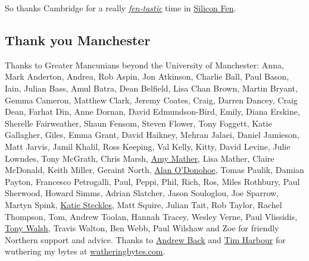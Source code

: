 \documentclass[
]{book}
\begin{document}
So thanks Cambridge for a really \emph{\href{https://en.wikipedia.org/wiki/The_Fens}{fen-tastic}} time in \href{https://en.wikipedia.org/wiki/Silicon_Fen}{Silicon Fen}. 🙏

\hypertarget{manchester}{%
\subsection{Thank you Manchester}\label{manchester}}

Thanks to Greater Mancunians beyond the University of Manchester: Anna, Mark Anderton, Andrea, Rob Aspin, Jon Atkinson, Charlie Ball, Paul Bason, Iain, Julian Bass, Amul Batra, Dean Belfield, Lisa Chan Brown, Martin Bryant, Gemma Cameron, Matthew Clark, Jeremy Coates, Craig, Darren Dancey, Craig Dean, Farhat Din, Anne Dornan, David Edmundson-Bird, Emily, Diana Erskine, Sherelle Fairweather, Shaun Fensom, Steven Flower, Tony Foggett, Katie Gallagher, Giles, Emma Grant, David Haikney, Mehran Jalaei, Daniel Jamieson, Matt Jarvis, Jamil Khalil, Ross Keeping, Val Kelly, Kitty, David Levine, Julie Lowndes, Tony McGrath, Chris Marsh, \href{https://twitter.com/MiniGirlGeek}{Amy Mather}, Lisa Mather, Claire McDonald, Keith Miller, Geraint North, \href{https://twitter.com/teknoteacher}{Alan O'Donohoe}, Tomas Paulik, Damian Payton, Francesco Petrogalli, Paul, Peppi, Phil, Rich, Ros, Miles Rothbury, Paul Sherwood, Howard Simms, Adrian Slatcher, Jason Souloglou, Joe Sparrow, Martyn Spink, \href{https://www.katiesteckles.co.uk/}{Katie Steckles}, Matt Squire, Julian Tait, Rob Taylor, Rachel Thompson, Tom, Andrew Toolan, Hannah Tracey, Wesley Verne, Paul Vlissidis, \href{https://en.wikipedia.org/wiki/Tony_Walsh_(poet)}{Tony Walsh}, Travis Walton, Ben Webb, Paul Wilshaw and Zoe for friendly Northern support and advice. Thanks to \href{https://twitter.com/9600}{Andrew Back} and \href{https://twitter.com/timharbour}{Tim Harbour} for wuthering my bytes at \href{https://wutheringbytes.com/}{wutheringbytes.com}.
\end{document}
